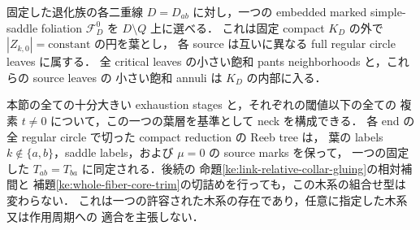 \begin{lemma}
\label{ke:fixed-marked-tree-exhaustion}
固定した退化族の各二重線 $D=D_{ab}$ に対し，一つの embedded marked
simple-saddle foliation $\mathcal F_D^0$ を $D\setminus Q$ 上に選べる．
これは固定 compact $K_D$ の外で $|Z_{k,0}|=\mathrm{constant}$ の円を葉とし，
各 source は互いに異なる full regular circle leaves に属する．
全 critical leaves の小さい飽和 pants neighborhoods と，これらの source leaves の
小さい飽和 annuli は $K_D$ の内部に入る．

本節の全ての十分大きい exhaustion stages と，それぞれの閾値以下の全ての
複素 $t\ne0$ について，この一つの葉層を基準として neck を構成できる．
各 end の全 regular circle で切った compact reduction の Reeb tree は，
葉の labels $k\notin\{a,b\}$，saddle labels，および $\mu=0$ の source marks を保って，
一つの固定した $T_{ab}=T_{ba}$ に同定される．後続の
命題\ref{ke:link-relative-collar-gluing}の相対補間と
補題\ref{ke:whole-fiber-core-trim}の切詰めを行っても，この木系の組合せ型は変わらない．
これは一つの許容された木系の存在であり，任意に指定した木系又は作用周期への
適合を主張しない．
\end{lemma}

